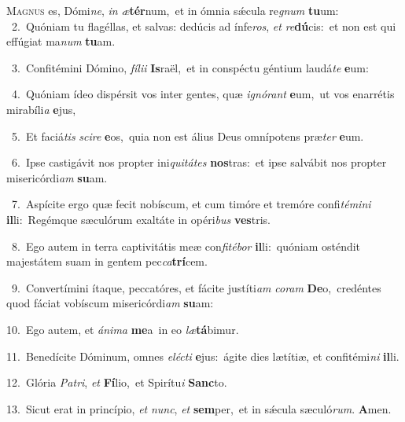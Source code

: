 \lettrine{\initial\textcolor{\initialcolor}{M}}{agnus} es, Dómi\-\textit{ne}\-, \textit{in} \textit{æ}\-\textbf{tér}num,~\star et in ómnia sǽcula re\textit{gnum} \textbf{tu}\-um:\\
{\numbfont\textcolor{\numbcolor}{~2.}}~Quóniam tu flagéllas, et salvas: dedúcis ad ínfe\-\textit{ros}\-, \textit{et} \textit{re}\-\textbf{dú}cis:~\star et non est qui effúgiat ma\textit{num} \textbf{tu}\-am.\par
{\numbfont\textcolor{\numbcolor}{~3.}}~Confitémini Dómino, \textit{fí}\-\textit{li}\textit{i} \textbf{Is}\-raël,~\star et in conspéctu géntium laudá\textit{te} \textbf{e}\-um:\par
{\numbfont\textcolor{\numbcolor}{~4.}}~Quóniam ídeo dispérsit vos inter gentes, quæ \textit{i}\-\textit{gnó}\textit{rant} \textbf{e}\-um,~\star ut vos enarrétis mirabíli\textit{a} \textbf{e}\-jus,\par
{\numbfont\textcolor{\numbcolor}{~5.}}~Et faciá\textit{tis} \textit{sci}\-\textit{re} \textbf{e}\-os,~\star quia non est álius Deus omnípotens præ\textit{ter} \textbf{e}\-um.\par
{\numbfont\textcolor{\numbcolor}{~6.}}~Ipse castigávit nos propter ini\-\textit{qui}\-\textit{tá}\textit{tes} \textbf{nos}\-tras:~\star et ipse salvábit nos propter misericórdi\textit{am} \textbf{su}\-am.\par
{\numbfont\textcolor{\numbcolor}{~7.}}~Aspícite ergo quæ fecit nobíscum, et cum timóre et tremóre confi\-\textit{té}\-\textit{mi}\textit{ni} \textbf{il}\-li:~\star Regémque sæculórum exaltáte in opéri\textit{bus} \textbf{ves}\-tris.\par
{\numbfont\textcolor{\numbcolor}{~8.}}~Ego autem in terra captivitátis meæ con\-\textit{fi}\-\textit{té}\textit{bor} \textbf{il}\-li:~\star quóniam osténdit majestátem suam in gentem pec\-\textit{ca}\-\textbf{trí}cem.\par
{\numbfont\textcolor{\numbcolor}{~9.}}~Convertímini ítaque, peccatóres, et fácite justíti\textit{am} \textit{co}\-\textit{ram} \textbf{De}\-o,~\star credéntes quod fáciat vobíscum misericórdi\textit{am} \textbf{su}\-am:\par
{\numbfont\textcolor{\numbcolor}{10.}}~Ego autem, et \textit{á}\-\textit{ni}\textit{ma} \textbf{me}\-a~\star in eo \textit{læ}\-\textbf{tá}bimur.\par
{\numbfont\textcolor{\numbcolor}{11.}}~Benedícite Dóminum, omnes \textit{e}\-\textit{léc}\textit{ti} \textbf{e}\-jus:~\star ágite dies lætítiæ, et confitémi\textit{ni} \textbf{il}\-li.\par
{\numbfont\textcolor{\numbcolor}{12.}}~Glória \textit{Pa}\-\textit{tri}, \textit{et} \textbf{Fí}\-lio,~\star et Spirítu\textit{i} \textbf{Sanc}\-to.\par
{\numbfont\textcolor{\numbcolor}{13.}}~Sicut erat in princípio, \textit{et} \textit{nunc}\-, \textit{et} \textbf{sem}\-per,~\star et in sǽcula sæculó\-\textit{rum}\-. \textbf{A}\-men.\par
